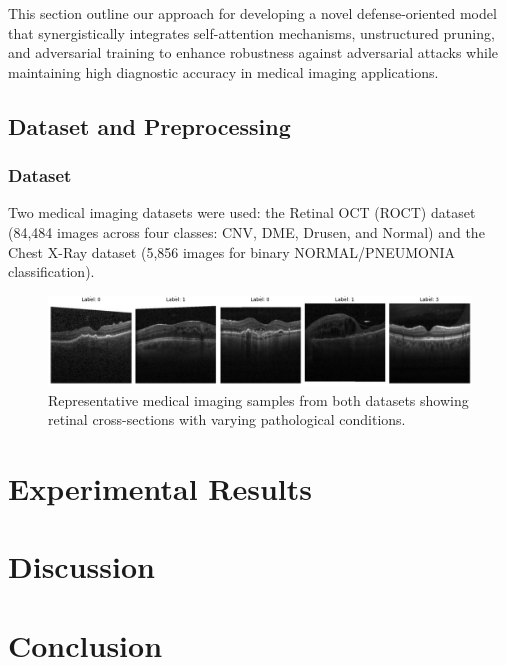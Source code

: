 \documentclass[preprint,12pt]{elsarticle}
\begin{document}
This section outline our approach for developing a novel defense-oriented model that synergistically integrates self-attention mechanisms, unstructured pruning, and adversarial training to enhance robustness against adversarial attacks while maintaining high diagnostic accuracy in medical imaging applications.

\subsection{Dataset and Preprocessing}

\subsubsection{Dataset}
Two medical imaging datasets were used: the Retinal OCT (ROCT) dataset (84,484 images across four classes: CNV, DME, Drusen, and Normal) and the Chest X-Ray dataset (5,856 images for binary NORMAL/PNEUMONIA classification).


\begin{figure}[!t]
\centering
\includegraphics[width=0.9\columnwidth]{fig/fig1_a.png}
\caption{Representative medical imaging samples from both datasets showing retinal cross-sections with varying pathological conditions.}
\label{fig:dataset_samples}
\end{figure}

\section{Experimental Results}
\label{sec:results}


\section{Discussion}
\label{sec:discussion}


\section{Conclusion}
\label{sec:conclusion}
\end{document}
